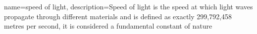{
    name=speed of light,
    description={Speed of light is the speed at which light waves propagate through different materials and is defined as exactly 299,792,458 metres per second, it is considered a fundamental constant of nature}
}
